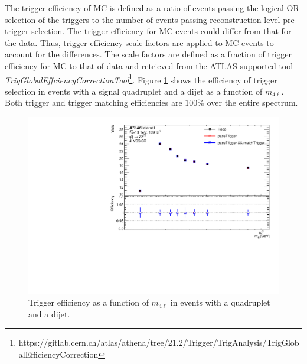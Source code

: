 The trigger efficiency of MC is defined as a ratio of events passing the logical OR selection of the triggers to the number of events passing reconstruction level pre-trigger selection. The trigger efficiency for MC events could differ from that for the data. Thus, trigger efficiency scale factors are applied to MC events to account for the differences. The scale factors are defined as a fraction of trigger efficiency for MC to that of data and retrieved from the ATLAS supported tool \textit{TrigGlobalEffciencyCorrectionTool}\footnote{https://gitlab.cern.ch/atlas/athena/tree/21.2/Trigger/TrigAnalysis/TrigGlobalEfficiencyCorrection}. Figure \ref{fig:Trigger} shows the efficiency of trigger selection in events with a signal quadruplet and a dijet as a function of $m_{4\ell}$. Both trigger and trigger matching efficiencies are $100\%$ over the entire spectrum. 
\begin{figure}
    \centering
    \includegraphics[width=.8\linewidth]{figures/AnalysisOverview/TriggerEfficiency.pdf}
    \caption{ Trigger efficiency as a function of $m_{4\ell}$ in events with a quadruplet and a dijet.\label{fig:Trigger}}
\end{figure}